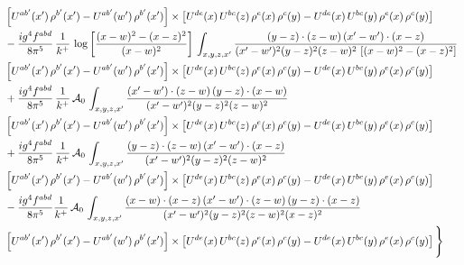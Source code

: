 \documentclass[10pt]{article}
\numberwithin{equation}{section}
\begin{document}
\begin{align}
& \left[U^{ab'}(x')\,\rho^{b'}(x')-U^{ab'}(w')\, \rho^{b'}(x')\right]\times \left[U^{de}(x)\,U^{bc}(z)\, \rho^{e}(x)\,\rho^{c}(y)-U^{de}(x)\,U^{bc}(y)\,\rho^{e}(x)\,\rho^{c}(y)\right] \notag \\
& -\frac{ig^{4}f^{abd}}{8\pi^{5}}\,\frac{1}{k^{+}}\,\log{\left[\frac{(x-w)^{2}-(x-z)^{2}}{(x-w)^{2}}\right]}\,\int_{x,y,z,x'}
\frac{(y-z)\cdot(z-w)\,(x'-w')\cdot(x-z)}{(x'-w')^{2}(y-z)^{2}(z-w)^{2}\,\left[(x-w)^{2}-(x-z)^{2}\right]}\notag \\ & \left[U^{ab'}(x')\,\rho^{b'}(x')-U^{ab'}(w')\, \rho^{b'}(x')\right]\times \left[U^{de}(x)\,U^{bc}(z)\, \rho^{e}(x)\,\rho^{c}(y)-U^{de}(x)\,U^{bc}(y)\,\rho^{e}(x)\,\rho^{c}(y)\right] \notag \\
& +\frac{ig^{4}f^{abd}}{8\pi^{5}}\,\frac{1}{k^{+}}\,\mathcal{A}_{0}\,\int_{x,y,z,x'}
\frac{(x'-w')\cdot(z-w)\,(y-z)\cdot(x-w)}{(x'-w')^{2}(y-z)^{2}(z-w)^{2}}\notag \\
& \left[U^{ab'}(x')\,\rho^{b'}(x')-U^{ab'}(w')\, \rho^{b'}(x')\right]\times \left[U^{de}(x)\,U^{bc}(z)\, \rho^{e}(x)\,\rho^{c}(y)-U^{de}(x)\,U^{bc}(y)\,\rho^{e}(x)\,\rho^{c}(y)\right] \notag \\
& +\frac{ig^{4}f^{abd}}{8\pi^{5}}\,\frac{1}{k^{+}}\,\mathcal{A}_{0}\,\int_{x,y,z,x'}
\frac{(y-z)\cdot(z-w)\,(x'-w')\cdot(x-z)}{(x'-w')^{2}(y-z)^{2}(z-w)^{2}}\notag \\ & \left[U^{ab'}(x')\,\rho^{b'}(x')-U^{ab'}(w')\, \rho^{b'}(x')\right]\times \left[U^{de}(x)\,U^{bc}(z)\, \rho^{e}(x)\,\rho^{c}(y)-U^{de}(x)\,U^{bc}(y)\,\rho^{e}(x)\,\rho^{c}(y)\right] \notag \\
& -\frac{ig^{4}f^{abd}}{8\pi^{5}}\frac{1}{k^{+}}\,\mathcal{A}_{0}\,\int_{x,y,z,x'}
\frac{(x-w)\cdot(x-z)\,(x'-w')\cdot(z-w)\,(y-z)\cdot(x-z)}{(x'-w')^{2}(y-z)^{2}(z-w)^{2}(x-z)^{2}}\notag \\ & \left[U^{ab'}(x')\,\rho^{b'}(x')-U^{ab'}(w')\, \rho^{b'}(x')\right]\times \left[U^{de}(x)\,U^{bc}(z)\, \rho^{e}(x)\,\rho^{c}(y)-U^{de}(x)\,U^{bc}(y)\,\rho^{e}(x)\,\rho^{c}(y)\right]\Bigg\}
\end{align}
\end{document}
